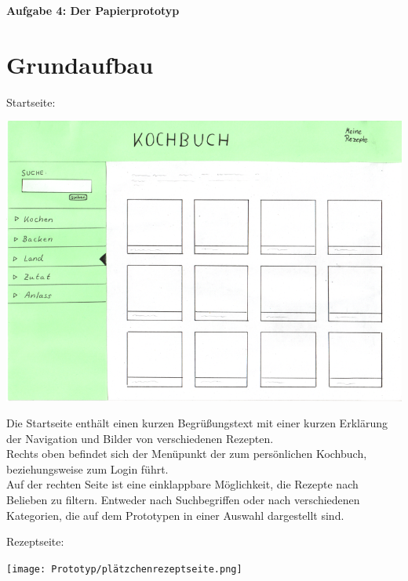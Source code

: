 \documentclass[parskip,10pt,abstracton]{scrartcl}
\renewcommand*{\maketitle}{%
	{\centering\LARGE\sffamily\bfseries Aufgabe 4: Der Papierprototyp \par}
	\vspace{3em}
}
\begin{document}
\maketitle



\section*{Grundaufbau}

Startseite:
\begin{center}
\includegraphics[scale=0.4]{Prototyp/home.png}
\end{center}

Die Startseite enthält einen kurzen Begrüßungstext mit einer kurzen Erklärung der Navigation und Bilder von verschiedenen Rezepten.\\
Rechts oben befindet sich der Menüpunkt der zum persönlichen Kochbuch, beziehungsweise zum Login führt.\\
Auf der rechten Seite ist eine einklappbare Möglichkeit, die Rezepte nach Belieben zu filtern. Entweder nach Suchbegriffen oder nach verschiedenen Kategorien, die auf dem Prototypen in einer Auswahl dargestellt sind.

Rezeptseite:
\begin{center}
\texttt{[image: Prototyp/plätzchenrezeptseite.png]}
\end{center}
\end{document}
